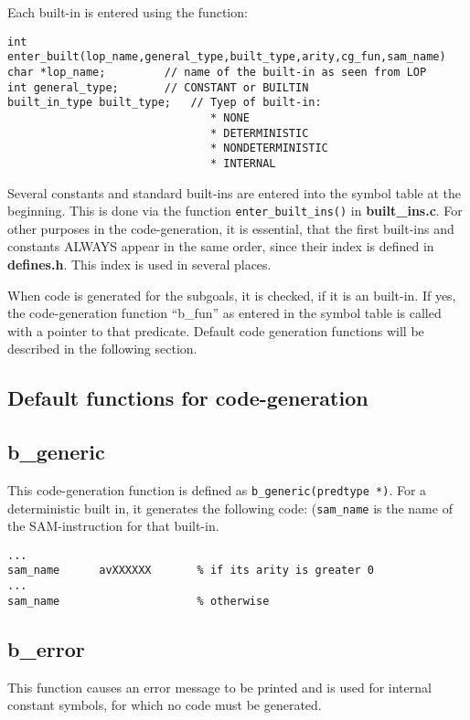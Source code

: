 Each built-in is entered using the function:
\begin{verbatim}
int enter_built(lop_name,general_type,built_type,arity,cg_fun,sam_name)
char *lop_name;         // name of the built-in as seen from LOP
int general_type;       // CONSTANT or BUILTIN
built_in_type built_type;   // Tyep of built-in:
                               * NONE
                               * DETERMINISTIC
                               * NONDETERMINISTIC
                               * INTERNAL
\end{verbatim}

Several constants and standard built-ins are entered into the
symbol table at the beginning. This is done via the function
{\tt enter\_built\_ins()} in {\bf built\_ins.c}.
For other purposes in the code-generation, it is essential, that
the first built-ins and constants ALWAYS appear in the same order,
since their index is defined in {\bf defines.h}. This index is
used in several places.

When code is generated for the subgoals, it is checked, if
it is an built-in. If yes, the code-generation function ``b\_fun'' as
entered in the symbol table is called with a pointer to that predicate.
Default code generation functions will be described in the following section.

\subsection{Default functions for code-generation}
\subsection{b\_generic}
This code-generation function is defined as {\tt b\_generic(predtype *)}.
For a deterministic built in, it generates the following code:
({\tt sam\_name} is the name of the SAM-instruction for that built-in.

\begin{verbatim}
...
sam_name      avXXXXXX       % if its arity is greater 0
...
sam_name                     % otherwise
\end{verbatim}

\subsection{b\_error}
This function causes an error message to be printed and is used for
internal constant symbols, for which no code must be generated.

